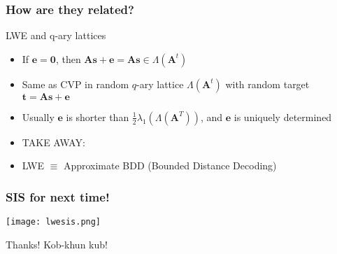 \documentclass{beamer}
\begin{document}
\begin{frame}
	\frametitle{How are they related?}
	LWE and q-ary lattices
	\begin{itemize}
		\item If $\mathbf{e}=\mathbf{0}$, then $\mathbf{A s}+\mathbf{e}=\mathbf{A} \mathbf{s} \in \Lambda\left(\mathbf{A}^t\right)$
		\item Same as CVP in random $q$-ary lattice $\Lambda\left(\mathbf{A}^t\right)$ with random target $\mathbf{t}=\mathbf{A s + e}$
		\item Usually $\mathbf{e}$ is shorter than $\frac{1}{2} \lambda_1\left(\Lambda\left(\mathbf{A}^T\right)\right)$, and $\mathbf{e}$ is uniquely determined
		\item TAKE AWAY: 
		\item LWE $\equiv$ Approximate BDD (Bounded Distance Decoding)
	\end{itemize}

	
\end{frame}


\begin{frame}
	\frametitle{SIS for next time!}
	\texttt{[image: lwesis.png]}
\end{frame}



\begin{frame}
	\centering \Large{Thanks! Kob-khun kub!}
\end{frame}
\end{document}
